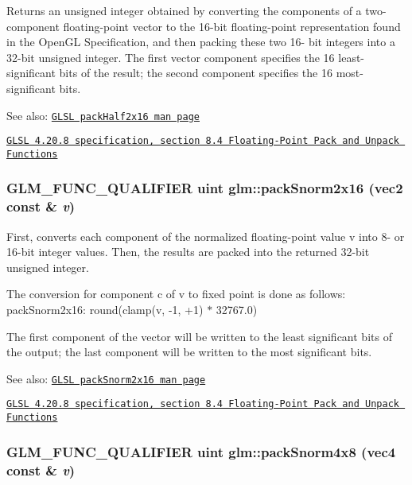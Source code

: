 Returns an unsigned integer obtained by converting the components of a two-component floating-point vector to the 16-bit floating-point representation found in the OpenGL Specification, and then packing these two 16- bit integers into a 32-bit unsigned integer. The first vector component specifies the 16 least-significant bits of the result; the second component specifies the 16 most-significant bits.

\begin{Desc}
\item[See also:]\href{http://www.opengl.org/sdk/docs/manglsl/xhtml/packHalf2x16.xml}{\tt GLSL packHalf2x16 man page} 

\href{http://www.opengl.org/registry/doc/GLSLangSpec.4.20.8.pdf}{\tt GLSL 4.20.8 specification, section 8.4 Floating-Point Pack and Unpack Functions} \end{Desc}
\hypertarget{group__core__func__packing_g0c8005de240d6c4ca3d16c7bee25c622}{
\subsubsection[packSnorm2x16]{\setlength{\rightskip}{0pt plus 5cm}GLM\_\-FUNC\_\-QUALIFIER uint glm::packSnorm2x16 (vec2 const \& {\em v})}}
\label{group__core__func__packing_g0c8005de240d6c4ca3d16c7bee25c622}


First, converts each component of the normalized floating-point value v into 8- or 16-bit integer values. Then, the results are packed into the returned 32-bit unsigned integer.

The conversion for component c of v to fixed point is done as follows: packSnorm2x16: round(clamp(v, -1, +1) $\ast$ 32767.0)

The first component of the vector will be written to the least significant bits of the output; the last component will be written to the most significant bits.

\begin{Desc}
\item[See also:]\href{http://www.opengl.org/sdk/docs/manglsl/xhtml/packSnorm2x16.xml}{\tt GLSL packSnorm2x16 man page} 

\href{http://www.opengl.org/registry/doc/GLSLangSpec.4.20.8.pdf}{\tt GLSL 4.20.8 specification, section 8.4 Floating-Point Pack and Unpack Functions} \end{Desc}
\hypertarget{group__core__func__packing_gfcf25acc0d361c6c696a433aa5dfd16b}{
\subsubsection[packSnorm4x8]{\setlength{\rightskip}{0pt plus 5cm}GLM\_\-FUNC\_\-QUALIFIER uint glm::packSnorm4x8 (vec4 const \& {\em v})}}
\label{group__core__func__packing_gfcf25acc0d361c6c696a433aa5dfd16b}


